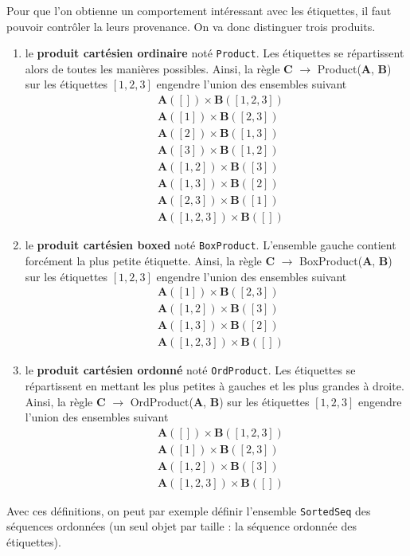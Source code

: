 \documentclass[11pt]{article}
\begin{document}
Pour que l'on obtienne un comportement intéressant avec les étiquettes, il
faut pouvoir contrôler la leurs provenance. On va donc distinguer trois
produits.
\begin{enumerate}
\item le \textbf{produit cartésien ordinaire} noté \texttt{Product}. Les
  étiquettes se répartissent alors de toutes les manières possibles. Ainsi,
  la règle \textbf{C} $\rightarrow$ Product(\textbf{A}, \textbf{B})
  sur les étiquettes $[1,2,3]$ engendre l'union des ensembles suivant
\begin{align*}
&\textbf{A}([]) \times \textbf{B}([1,2,3]) \\
 &\textbf{A}([1]) \times \textbf{B}([2,3]) \\ 
 &\textbf{A}([2]) \times \textbf{B}([1,3]) \\ 
 &\textbf{A}([3]) \times \textbf{B}([1,2]) \\ 
 &\textbf{A}([1,2]) \times \textbf{B}([3]) \\ 
 &\textbf{A}([1,3]) \times \textbf{B}([2]) \\ 
 &\textbf{A}([2,3]) \times \textbf{B}([1]) \\ 
 &\textbf{A}([1,2,3]) \times \textbf{B}([])
\end{align*}

\item le \textbf{produit cartésien boxed} noté \texttt{BoxProduct}. 
L'ensemble gauche contient forcément la plus petite étiquette.
Ainsi, la règle \textbf{C} $\rightarrow$ BoxProduct(\textbf{A}, \textbf{B})
  sur les étiquettes $[1,2,3]$ engendre l'union des ensembles suivant
\begin{align*}
 &\textbf{A}([1]) \times \textbf{B}([2,3]) \\ 
 &\textbf{A}([1,2]) \times \textbf{B}([3]) \\ 
 &\textbf{A}([1,3]) \times \textbf{B}([2]) \\ 
 &\textbf{A}([1,2,3]) \times \textbf{B}([])
\end{align*}
\item le \textbf{produit cartésien ordonné} noté \texttt{OrdProduct}. Les
  étiquettes se répartissent en mettant les plus petites à gauches et les plus
  grandes à droite. Ainsi, la règle \textbf{C} $\rightarrow$ OrdProduct(\textbf{A}, \textbf{B})
  sur les étiquettes $[1,2,3]$ engendre l'union des ensembles suivant
\begin{align*}
&\textbf{A}([]) \times \textbf{B}([1,2,3]) \\
 &\textbf{A}([1]) \times \textbf{B}([2,3]) \\ 
 &\textbf{A}([1,2]) \times \textbf{B}([3]) \\ 
 &\textbf{A}([1,2,3]) \times \textbf{B}([])
\end{align*}
\end{enumerate}
Avec ces définitions, on peut par exemple définir l'ensemble {\tt SortedSeq} des séquences
ordonnées (un seul objet par taille : la séquence ordonnée des étiquettes).
\end{document}
